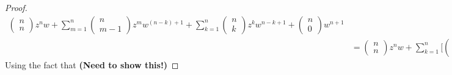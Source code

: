 \documentclass[a4paper]{article}
\begin{document}
\begin{proof}
\begin{align*}
\begin{pmatrix}
                                               n \\
                                               n 
                                              \end{pmatrix} z^{n} w + \sum_{ m=1  }^{ n } \begin{pmatrix} 
                                                         n \\
                                                         m-1
                                                     \end{pmatrix} z^{m} w^{(n-k)+1} + \sum_{ k=1 }^{ n } \begin{pmatrix} 
                                                                n \\
                                                                k 
                                                               \end{pmatrix}  z^{k } w^{n -k  + 1}  +  \begin{pmatrix} 
                                                                n \\
                                                                0  
                                                            \end{pmatrix} w^{n+1} \\
                                                            &=  \begin{pmatrix} 
                                               n \\
                                               n 
                                               \end{pmatrix} z^{n} w + \sum_{ k=1  }^{ n } \Bigg[ \begin{pmatrix} n \\ k  \end{pmatrix} + \begin{pmatrix} n \\ k - 1  \end{pmatrix}\Bigg] z^{k } w^{(n+1)-k}  +  \begin{pmatrix} 
                                                                n \\
                                                                0  
                                                            \end{pmatrix} w^{n+1}.
        \end{align*}
        Using the fact that \textbf{(Need to show this!)} 

\end{proof}
\end{document}
